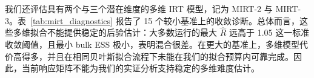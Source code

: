 \begin{table}[t]
\centering
\small
\caption{\textbf{BIC 偏向 2PL 的基准上的后验诊断。}
我们报告拟合参数上的最大 $\hat{R}$、最小 bulk ESS 以及发散转移次数。尽管 BIC 在这四个基准上偏向 2PL，2PL 拟合的采样诊断明显更差，而相应的 1PL 拟合仍然表现良好。}
\label{tab:irt_2pl_diagnostics}
\end{table}

我们还评估具有两个与三个潜在维度的多维 IRT 模型，记为 MIRT-2 与 MIRT-3。表~\ref{tab:mirt_diagnostics} 报告了 15 个较小基准上的收敛诊断。总体而言，这些多维拟合不能提供稳定的后验估计：大多数运行的最大 $\hat{R}$ 远高于 1.05 这一标准收敛阈值，且最小 bulk ESS 极小，表明混合很差。在更大的基准上，多维模型代价高得多，并且在相同贝叶斯拟合流程下未能在我们的拟合预算内可靠完成。因此，当前响应矩阵不能为我们的实证分析支持稳定的多维难度估计。

